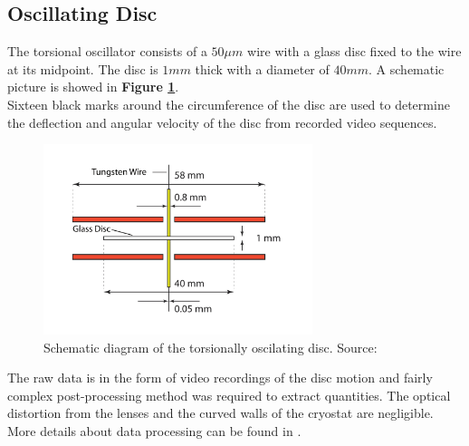 \newpage

\subsection*{Oscillating Disc}

The torsional oscillator consists of a $50 \mu\unit{m}$ wire  with a glass disc fixed to
the wire at its midpoint. The disc is $1\unit{mm}$ thick with a diameter of $40\unit{mm}$. A schematic picture is showed in \textbf{Figure \ref{disc}}.\\
Sixteen black marks around the circumference of the disc are used to determine the deflection and angular velocity of the disc from recorded video sequences.

\begin{figure}[h]
	\centering
	\includegraphics[width=0.7\textwidth]{graphics/exp/disc}
	\caption{Schematic diagram of the torsionally oscilating disc. Source: \cite{universal_scaling}}
	\label{disc}
\end{figure}

The raw data is in the form of video recordings of the disc motion and fairly complex post-processing method was required to extract quantities. The optical distortion from the lenses and the curved walls of the cryostat are negligible. More details about data processing can be found in \cite{universal_scaling}.

\newpage
